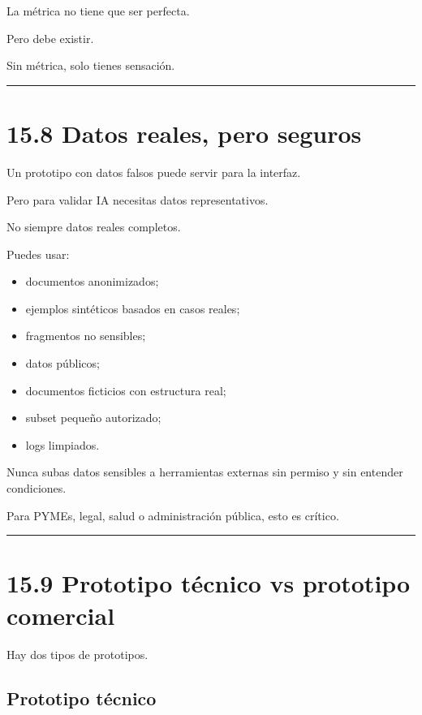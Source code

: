 La métrica no tiene que ser perfecta.

Pero debe existir.

Sin métrica, solo tienes sensación.

\begin{center}\rule{0.5\linewidth}{0.5pt}\end{center}

\section{15.8 Datos reales, pero
seguros}\label{datos-reales-pero-seguros}

Un prototipo con datos falsos puede servir para la interfaz.

Pero para validar IA necesitas datos representativos.

No siempre datos reales completos.

Puedes usar:

\begin{itemize}
\tightlist
\item
  documentos anonimizados;
\item
  ejemplos sintéticos basados en casos reales;
\item
  fragmentos no sensibles;
\item
  datos públicos;
\item
  documentos ficticios con estructura real;
\item
  subset pequeño autorizado;
\item
  logs limpiados.
\end{itemize}

Nunca subas datos sensibles a herramientas externas sin permiso y sin
entender condiciones.

Para PYMEs, legal, salud o administración pública, esto es crítico.

\begin{center}\rule{0.5\linewidth}{0.5pt}\end{center}

\section{15.9 Prototipo técnico vs prototipo
comercial}\label{prototipo-tuxe9cnico-vs-prototipo-comercial}

Hay dos tipos de prototipos.

\subsection{Prototipo técnico}\label{prototipo-tuxe9cnico}

